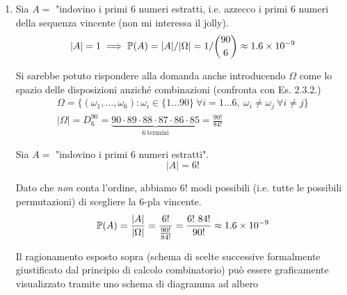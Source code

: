 \begin{enumerate}
\item Sia $A=$ "indovino i primi $6$ numeri estratti, i.e. azzecco i primi $6$ numeri della sequenza vincente (non mi interessa il jolly).\begin{equation*}
| A| =1\implies \PP( A) =| A| /| \Omega | =1/\binom{90}{6} \approx 1.6\times 10^{-9}
\end{equation*}

\begin{oss}
Si sarebbe potuto rispondere alla domanda anche introducendo $\Omega $ come lo spazio delle disposizioni anziché combinazioni (confronta con Es. 2.3.2.)\begin{gather*}
\Omega =\{( \omega _{1} ,\dots ,\omega _{6}) :\omega _{i} \in \{1\dots 90\} \ \forall i=1\dots 6,\ \omega _{i} \neq \omega _{j} \ \forall i\neq j\}\\
| \Omega | =D_{6}^{90} =\underbrace{90\cdot 89\cdot 88\cdot 87\cdot 86\cdot 85}_{6\ \text{termini}} =\frac{90!}{84!}
\end{gather*}
\end{oss}

Sia $A=$ "indovino i primi $6$ numeri estratti".\begin{equation*}
| A| =6!
\end{equation*}

Dato che \textit{non} conta l'ordine, abbiamo $6!$ modi possibili (i.e. tutte le possibili permutazioni) di scegliere la $6$-pla vincente.\begin{equation*}
\PP( A) =\frac{| A| }{| \Omega | } =\frac{6!}{\frac{90!}{84!}} =\frac{6!\ 84!}{90!} \approx 1.6\times 10^{-9}
\end{equation*}

Il ragionamento esposto sopra (schema di scelte successive formalmente giustificato dal principio di calcolo combinatorio) può essere graficamente visualizzato tramite uno schema di diagramma ad albero


\begin{tikzpicture}[x=0.75pt,y=0.75pt,yscale=-1,xscale=1]


\end{tikzpicture}
\end{enumerate}
